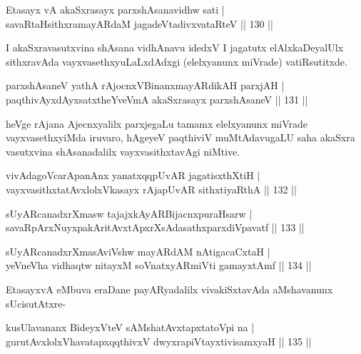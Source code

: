 \begin{shl}
Etasayx vA akaSxrasayx parxshAsanavidhw sati |\\
savaRtaHsithxramayARdaM jagadeVtadivxvataRteV \hfill || 130 ||
\end{shl}

\begin{artha}%
I akaSxravasutxvina shAsana vidhAnavu idedxV I jagatutx elAlxkaDeyalUlx sithxravAda vayxvasethxyuLaLxdAdxgi (elelxyanunx miVrade) vatiRsutitxde.
\end{artha}

\begin{shl}
parxshAsaneV yathA rAjocnxV\s BinanxmayARdikAH parxjAH |\\
paqthivAyxdAyxsatxtheYveVmA akaSxrasayx parxshAsaneV \hfill || 131 ||
\end{shl}

\begin{artha}
heVge rAjana Ajecnxyalilx parxjegaLu tamamx elelxyanunx miVrade vayxvasethxyiMda iruvaro, hAgeyeV paqthiviV muMtAdavugaLU saha akaSxra vasutxvina shAsanadalilx vayxvasithxtavAgi niMtive.
\end{artha}


\begin{shl}
vivAdagoVcarApanAnx yanatxqqpUvAR jagatisxthXtiH |\\
vayxvasithxtatAvxlolxVkasayx rAjapUvAR sithxtiyaRthA \hfill || 132 ||
\end{shl}

\begin{shl}
sUyARcanadxrXmasw tajajxkAyARBijacnxpuraHsarw |\\
savaRpArxNuyxpakAritAvxtApxrXsAdasathxparxdiVpavatf \hfill || 133 ||
\end{shl}

\begin{shl}
sUyARcanadxrXmasAviVshw mayARdAM nAtigacaCxtaH |\\
yeVneVha vidhaqtw nitayxM soV\s natxyARmiVti gamayxtAmf \hfill || 134 ||
\end{shl}

\begin{artha}
EtasayxvA eMbuva eraDane payARyadalilx vivakiSxtavAda aMshavanunx sUcisutAtxre-
\end{artha}

\begin{shl}
kusUlavananx BideyxVteV sAMshatAvxtapxtatoV\s pi na |\\
gurutAvxlolxVhavatapxqqthivxV dwyxrapiVtayxtivisamxyaH \hfill || 135 ||
\end{shl}

